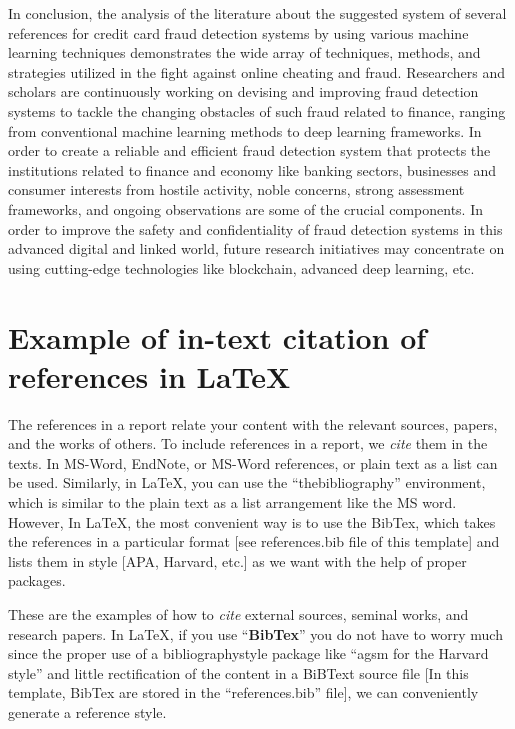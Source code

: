 In conclusion, the analysis of the literature about the suggested system of several references
for credit card fraud detection systems by using various machine learning techniques
demonstrates the wide array of techniques, methods, and strategies utilized in the fight against
online cheating and fraud. Researchers and scholars are continuously working on devising and
improving fraud detection systems to tackle the changing obstacles of such fraud related to
finance, ranging from conventional machine learning methods to deep learning frameworks. In
order to create a reliable and efficient fraud detection system that protects the institutions
related to finance and economy like banking sectors, businesses and consumer interests from
hostile activity, noble concerns, strong assessment frameworks, and ongoing observations are
some of the crucial components. In order to improve the safety and confidentiality of fraud
detection systems in this advanced digital and linked world, future research initiatives may
concentrate on using cutting-edge technologies like blockchain, advanced deep learning, etc.



\section{Example of in-text citation of references in \LaTeX} 
The references in a report relate your content with the relevant sources, papers, and the works of others. To include references in a report, we \textit{cite} them in the texts. In MS-Word, EndNote, or MS-Word references, or plain text as a list can be used. Similarly, in \LaTeX, you can use the ``thebibliography'' environment, which is similar to the plain text as a list arrangement like the MS word. However, In \LaTeX, the most convenient way is to use the BibTex, which takes the references in a particular format [see references.bib file of this template] and lists them in style [APA, Harvard, etc.] as we want with the help of proper packages.    

These are the examples of how to \textit{cite} external sources, seminal works, and research papers. In \LaTeX, if you use ``\textbf{BibTex}'' you do not have to worry much since the proper use of a bibliographystyle package like ``agsm for the Harvard style'' and little rectification of the content in a BiBText source file [In this template, BibTex are stored in the ``references.bib'' file], we can conveniently generate  a reference style. 

